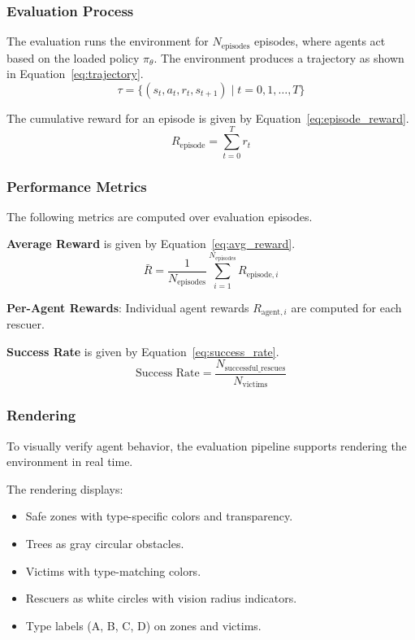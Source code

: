 \documentclass[11pt,a4paper]{article}
\begin{document}
\subsubsection{Evaluation Process}
\label{subsubsec:eval_process}

The evaluation runs the environment for $N_{\text{episodes}}$ episodes, where agents act based on the loaded policy $\pi_{\theta}$.
The environment produces a trajectory as shown in Equation~\ref{eq:trajectory}.
\begin{equation}
\label{eq:trajectory}
\tau = \{(s_t, a_t, r_t, s_{t+1}) \mid t = 0, 1, \ldots, T\}
\end{equation}

The cumulative reward for an episode is given by Equation~\ref{eq:episode_reward}.
\begin{equation}
\label{eq:episode_reward}
R_{\text{episode}} = \sum_{t=0}^{T} r_t
\end{equation}

\subsubsection{Performance Metrics}
\label{subsubsec:perf_metrics}

The following metrics are computed over evaluation episodes.

\textbf{Average Reward} is given by Equation~\ref{eq:avg_reward}.
\begin{equation}
\label{eq:avg_reward}
\bar{R} = \frac{1}{N_{\text{episodes}}} \sum_{i=1}^{N_{\text{episodes}}} R_{\text{episode},i}
\end{equation}

\textbf{Per-Agent Rewards}: Individual agent rewards $R_{\text{agent},i}$ are computed for each rescuer.

\textbf{Success Rate} is given by Equation~\ref{eq:success_rate}.
\begin{equation}
\label{eq:success_rate}
\text{Success Rate} = \frac{N_{\text{successful\_rescues}}}{N_{\text{victims}}}
\end{equation}

\subsubsection{Rendering}
\label{subsubsec:rendering}

To visually verify agent behavior, the evaluation pipeline supports rendering the environment in real time.

The rendering displays:
\begin{itemize}
    \item Safe zones with type-specific colors and transparency.
    \item Trees as gray circular obstacles.
    \item Victims with type-matching colors.
    \item Rescuers as white circles with vision radius indicators.
    \item Type labels (A, B, C, D) on zones and victims.
\end{itemize}
\end{document}
